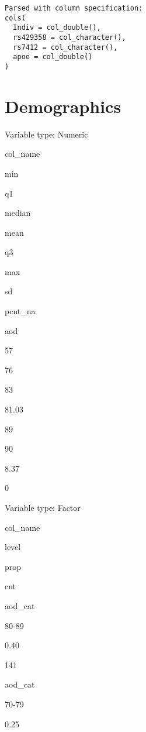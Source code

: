 \documentclass[]{book}
\newenvironment{Shaded}{\begin{snugshade}}{\end{snugshade}}
\newcommand{\DataTypeTok}[1]{\textcolor[rgb]{0.13,0.29,0.53}{#1}}
\newcommand{\KeywordTok}[1]{\textcolor[rgb]{0.13,0.29,0.53}{\textbf{#1}}}
\newcommand{\NormalTok}[1]{#1}
\newcommand{\OperatorTok}[1]{\textcolor[rgb]{0.81,0.36,0.00}{\textbf{#1}}}
\newcommand{\StringTok}[1]{\textcolor[rgb]{0.31,0.60,0.02}{#1}}
\begin{document}
\begin{Shaded}
\end{Shaded}

\begin{verbatim}
Parsed with column specification:
cols(
  Indiv = col_double(),
  rs429358 = col_character(),
  rs7412 = col_character(),
  apoe = col_double()
)
\end{verbatim}

\hypertarget{demographics}{%
\section{Demographics}\label{demographics}}

\label{tab:mayo-demo-n}Variable type: Numeric

col\_name

min

q1

median

mean

q3

max

sd

pcnt\_na

aod

57

76

83

81.03

89

90

8.37

0

\label{tab:mayo-demo-c}Variable type: Factor

col\_name

level

prop

cnt

aod\_cat

80-89

0.40

141

aod\_cat

70-79

0.25
\end{document}
